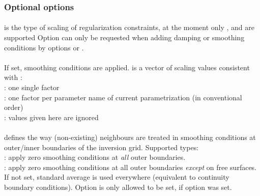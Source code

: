 \subsubsection{Optional options}
\paragraph{}
 is the type of scaling of regularization constraints, at the moment only 
,  and  are supported
Option  can only be requested when adding damping or smoothing conditions by options 
 or .
\paragraph{}
If set, smoothing conditions are applied.  is a vector of scaling values consistent 
with :\\
: one single factor\\
: one factor per parameter name of current parametrization (in conventional order)\\
 : values given here are ignored
\paragraph{}
 defines the way (non-existing) neighbours are treated in smoothing conditions at outer/inner 
boundaries of the inversion grid. Supported types:\\
: apply zero smoothing conditions at \emph{all} outer boundaries.\\
: apply zero smoothing conditions at all outer boundaries \emph{except} on free surfaces. \\
If not set, standard average is used everywhere (equivalent to continuity boundary conditions).
Option  is only allowed to be set, if option  was set.
